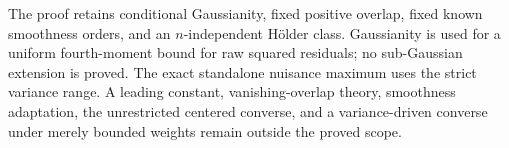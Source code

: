 The proof retains conditional Gaussianity, fixed positive overlap, fixed known smoothness orders, and an \(n\)-independent Hölder class.  Gaussianity is used for a uniform fourth-moment bound for raw squared residuals; no sub-Gaussian extension is proved.  The exact standalone nuisance maximum uses the strict variance range.  A leading constant, vanishing-overlap theory, smoothness adaptation, the unrestricted centered converse, and a variance-driven converse under merely bounded weights remain outside the proved scope.